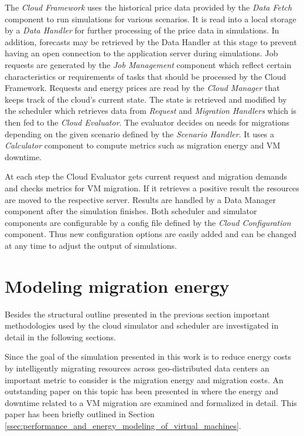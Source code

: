 The \textit{Cloud Framework} uses the historical price data provided by the \textit{Data Fetch} component to run simulations for various scenarios. It is read into a local storage by a \textit{Data Handler} for further processing of the price data in simulations. In addition, forecasts may be retrieved by the Data Handler at this stage to prevent having an open connection to the application server during simulations. Job requests are generated by the \textit{Job Management} component which reflect certain characteristics or requirements of tasks that should be processed by the Cloud Framework. Requests and energy prices are read by the \textit{Cloud Manager} that keeps track of the cloud's current state. The state is retrieved and modified by the scheduler which retrieves data from \textit{Request} and \textit{Migration Handlers} which is then fed to the \textit{Cloud Evaluator}. The evaluator decides on needs for migrations depending on the given scenario defined by the \textit{Scenario Handler}. It uses a \textit{Calculator} component to compute metrics such as migration energy and VM downtime. 

At each step the Cloud Evaluator gets current request and migration demands and checks metrics for VM migration. If it retrieves a positive result the resources are moved to the respective server. Results are handled by a Data Manager component after the simulation finishes. Both scheduler and simulator components are configurable by a config file defined by the \textit{Cloud Configuration} component. Thus new configuration options are easily added and can be changed at any time to adjust the output of simulations. 




\section{Modeling migration energy}

Besides the structural outline presented in the previous section important methodologies used by the cloud simulator and scheduler are investigated in detail in the following sections. 

Since the goal of the simulation presented in this work is to reduce energy costs by intelligently migrating resources across geo-distributed data centers an important metric to consider is the migration energy and migration costs. An outstanding paper on this topic has been presented in \cite{liu2013performance} where the energy and downtime related to a VM migration are examined and formalized in detail. This paper has been briefly outlined in Section \ref{ssec:performance_and_energy_modeling_of_virtual_machines}. 

